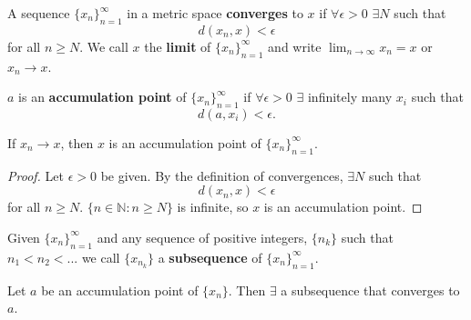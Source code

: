 \documentclass[compress]{beamer}
\newcommand{\seq}[1]{\{{#1}_n \}_{n=1}^\infty }
\begin{document}
\begin{frame}
  \begin{definition}
    A sequence $\{x_n\}_{n=1}^\infty$ in a metric space
    \textbf{converges} to $x$ if $\forall \epsilon > 0$ $\exists N$
    such that
    \[ d(x_n, x) < \epsilon \]
    for all $n \geq N$. We call $x$ the \textbf{limit} of $\seq{x}$ and
    write $\lim_{n \rightarrow \infty} x_n = x$ or $x_n \rightarrow x$. 
  \end{definition}
\end{frame}

\begin{frame}
  \begin{definition}
    $a$ is an \textbf{accumulation point} of $\seq{x}$ if $\forall
    \epsilon > 0$ $\exists$ infinitely many $x_i$ such that 
    \[ d(a, x_i ) < \epsilon. \]
  \end{definition}
\end{frame}

\begin{frame}
  \begin{lemma}
    If $x_n \rightarrow x$, then $x$ is an accumulation point of
    $\seq{x}$. 
  \end{lemma}
  \begin{proof}
    Let $\epsilon>0$ be given. By the definition of convergences,
    $\exists N$ such that 
    \[ d(x_n,x) < \epsilon \]
    for all $n \geq N$. $\{n\in \mathbb{N}: n\geq N\}$ is infinite, so
    $x$ is an accumulation point.
  \end{proof}
\end{frame}


\begin{frame}
  \begin{definition}
    Given $\seq{x}$ and any sequence of positive integers, $\{n_k\}$
    such that $n_1 < n_2 < ... $ we call $\{x_{n_k}\}$ a
    \textbf{subsequence} of $\seq{x}$. 
  \end{definition}
  \begin{lemma}
    Let $a$ be an accumulation point of $\{x_n\}$. Then $\exists$
    a subsequence that converges to $a$. 
  \end{lemma}
\end{frame}
\end{document}
